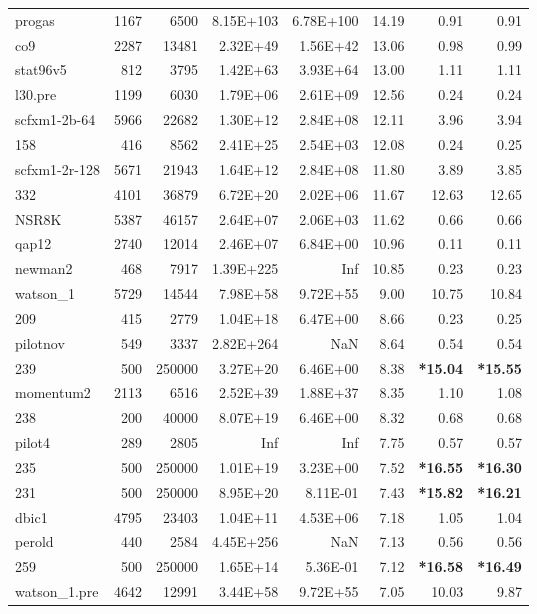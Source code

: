 \documentclass[10pt]{article}
\newcommand{\red}{
	\color{red}	
	}
\begin{document}
\begin{longtable}{|l|r|r|r|r|r|r|r|}
progas	&	1167	&	6500	&	8.15E+103	&	6.78E+100	&	14.19	&	0.91	&	0.91	\\
co9	&	2287	&	13481	&	2.32E+49	&	1.56E+42	&	13.06	&	0.98	&	0.99	\\
stat96v5	&	812	&	3795	&	1.42E+63	&	3.93E+64	&	13.00	&	1.11	&	1.11	\\
l30.pre	&	1199	&	6030	&	1.79E+06	&	2.61E+09	&	12.56	&	0.24	&	0.24	\\
scfxm1-2b-64	&	5966	&	22682	&	1.30E+12	&	2.84E+08	&	12.11	&	3.96	&	3.94	\\
158	&	416	&	8562	&	2.41E+25	&	2.54E+03	&	12.08	&	0.24	&	0.25	\\
scfxm1-2r-128	&	5671	&	21943	&	1.64E+12	&	2.84E+08	&	11.80	&	3.89	&	3.85	\\
332	&	4101	&	36879	&	6.72E+20	&	2.02E+06	&	11.67	&	12.63	&	12.65	\\
NSR8K	&	5387	&	46157	&	2.64E+07	&	2.06E+03	&	11.62	&	0.66	&	0.66	\\
qap12	&	2740	&	12014	&	2.46E+07	&	6.84E+00	&	10.96	&	0.11	&	0.11	\\
newman2	&	468	&	7917	&	1.39E+225	&	Inf	&	10.85	&	0.23	&	0.23	\\
watson\_1	&	5729	&	14544	&	7.98E+58	&	9.72E+55	&	9.00	&	10.75	&	10.84	\\
209	&	415	&	2779	&	1.04E+18	&	6.47E+00	&	8.66	&	0.23	&	0.25	\\
pilotnov	&	549	&	3337	&	2.82E+264	&	NaN	&	8.64	&	0.54	&	0.54	\\
239	&	500	&	250000	&	3.27E+20	&	6.46E+00	&	8.38	&	{\bf \red *15.04}	&	{\bf \red *15.55}	\\
momentum2	&	2113	&	6516	&	2.52E+39	&	1.88E+37	&	8.35	&	1.10	&	1.08	\\
238	&	200	&	40000	&	8.07E+19	&	6.46E+00	&	8.32	&	0.68	&	0.68	\\
pilot4	&	289	&	2805	&	Inf	&	Inf	&	7.75	&	0.57	&	0.57	\\
235	&	500	&	250000	&	1.01E+19	&	3.23E+00	&	7.52	&	{\bf \red *16.55} 	&	{\bf \red *16.30} 	\\
231	&	500	&	250000	&	8.95E+20	&	8.11E-01	&	7.43	&	{\bf \red *15.82} 	&	{\bf \red *16.21} 	\\
dbic1	&	4795	&	23403	&	1.04E+11	&	4.53E+06	&	7.18	&	1.05	&	1.04	\\
perold	&	440	&	2584	&	4.45E+256	&	NaN	&	7.13	&	0.56	&	0.56	\\
259	&	500	&	250000	&	1.65E+14	&	5.36E-01	&	7.12	&	{\bf \red *16.58} 	&	{\bf \red *16.49} 	\\
watson\_1.pre	&	4642	&	12991	&	3.44E+58	&	9.72E+55	&	7.05	&	10.03	&	9.87	\\

\end{longtable}
\end{document}
